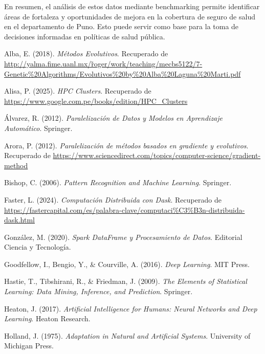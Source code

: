 	En resumen, el análisis de estos datos mediante benchmarking permite identificar áreas de fortaleza y oportunidades de mejora en la cobertura de seguro de salud en el departamento de Puno. Esto puede servir como base para la toma de decisiones informadas en políticas de salud pública.
	
	\begin{thebibliography}{9}
		
		\item Alba, E. (2018). \textit{Métodos Evolutivos}. Recuperado de \href{http://yalma.fime.uanl.mx/~roger/work/teaching/mecbs5122/7-Genetic\%20Algorithms/Evolutivos\%20by\%20Alba\%20Laguna\%20Marti.pdf}{http://yalma.fime.uanl.mx/\~roger/work/teaching/mecbs5122/7-Genetic\%20Algorithms/Evolutivos\%20by\%20Alba\%20Laguna\%20Marti.pdf}
		\item Alisa, P. (2025). \textit{HPC Clusters}. Recuperado de \href{https://www.google.com.pe/books/edition/HPC_Clusters}{https://www.google.com.pe/books/edition/HPC\_Clusters}
		\item Álvarez, R. (2012). \textit{Paralelización de Datos y Modelos en Aprendizaje Automático}. Springer.
		\item Arora, P. (2012). \textit{Paralelización de métodos basados en gradiente y evolutivos}. Recuperado de \href{https://www.sciencedirect.com/topics/computer-science/gradient-method}{https://www.sciencedirect.com/topics/computer-science/gradient-method}
		\item Bishop, C. (2006). \textit{Pattern Recognition and Machine Learning}. Springer.
		\item Faster, L. (2024). \textit{Computación Distribuida con Dask}. Recuperado de \href{https://fastercapital.com/es/palabra-clave/computaci\%C3\%B3n-distribuida-dask.html}{https://fastercapital.com/es/palabra-clave/computaci\%C3\%B3n-distribuida-dask.html}
		\item González, M. (2020). \textit{Spark DataFrame y Procesamiento de Datos}. Editorial Ciencia y Tecnología.
		\item Goodfellow, I., Bengio, Y., \& Courville, A. (2016). \textit{Deep Learning}. MIT Press.
		\item Hastie, T., Tibshirani, R., \& Friedman, J. (2009). \textit{The Elements of Statistical Learning: Data Mining, Inference, and Prediction}. Springer.
		\item Heaton, J. (2017). \textit{Artificial Intelligence for Humans: Neural Networks and Deep Learning}. Heaton Research.
		\item Holland, J. (1975). \textit{Adaptation in Natural and Artificial Systems}. University of Michigan Press.

\end{thebibliography}
